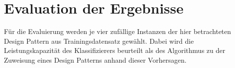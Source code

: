 \section{Evaluation der Ergebnisse}

Für die Evaluierung werden je vier zufällige Instanzen der hier betrachteten Design Pattern aus Trainingsdatensatz gewählt.
Dabei wird die Leistungskapazität des Klassifizierers beurteilt als des Algorithmus zu der Zuweisung eines Design Patterns anhand dieser Vorhersagen. 